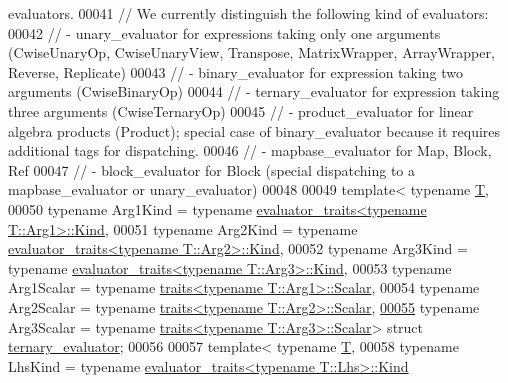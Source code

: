 \begin{DoxyCode}
{       evaluators.}
00041 \textcolor{comment}{// We currently distinguish the following kind of evaluators:}
00042 \textcolor{comment}{// - unary\_evaluator    for expressions taking only one arguments (CwiseUnaryOp, CwiseUnaryView, Transpose,
       MatrixWrapper, ArrayWrapper, Reverse, Replicate)}
00043 \textcolor{comment}{// - binary\_evaluator   for expression taking two arguments (CwiseBinaryOp)}
00044 \textcolor{comment}{// - ternary\_evaluator   for expression taking three arguments (CwiseTernaryOp)}
00045 \textcolor{comment}{// - product\_evaluator  for linear algebra products (Product); special case of binary\_evaluator because it
       requires additional tags for dispatching.}
00046 \textcolor{comment}{// - mapbase\_evaluator  for Map, Block, Ref}
00047 \textcolor{comment}{// - block\_evaluator    for Block (special dispatching to a mapbase\_evaluator or unary\_evaluator)}
00048 
00049 \textcolor{keyword}{template}< \textcolor{keyword}{typename} \hyperlink{group___sparse_core___module}{T},
00050           \textcolor{keyword}{typename} Arg1Kind   = \textcolor{keyword}{typename} 
      \hyperlink{struct_eigen_1_1internal_1_1_index_based}{evaluator\_traits<typename T::Arg1>::Kind},
00051           \textcolor{keyword}{typename} Arg2Kind   = \textcolor{keyword}{typename} 
      \hyperlink{struct_eigen_1_1internal_1_1_index_based}{evaluator\_traits<typename T::Arg2>::Kind},
00052           \textcolor{keyword}{typename} Arg3Kind   = \textcolor{keyword}{typename} 
      \hyperlink{struct_eigen_1_1internal_1_1_index_based}{evaluator\_traits<typename T::Arg3>::Kind},
00053           \textcolor{keyword}{typename} Arg1Scalar = \textcolor{keyword}{typename} \hyperlink{struct_eigen_1_1internal_1_1traits}{traits<typename T::Arg1>::Scalar},
00054           \textcolor{keyword}{typename} Arg2Scalar = \textcolor{keyword}{typename} \hyperlink{struct_eigen_1_1internal_1_1traits}{traits<typename T::Arg2>::Scalar},
\hyperlink{struct_eigen_1_1internal_1_1ternary__evaluator}{00055}           \textcolor{keyword}{typename} Arg3Scalar = \textcolor{keyword}{typename} \hyperlink{struct_eigen_1_1internal_1_1traits}{traits<typename T::Arg3>::Scalar}> \textcolor{keyword}{
      struct }\hyperlink{struct_eigen_1_1internal_1_1ternary__evaluator}{ternary\_evaluator};
00056 
00057 \textcolor{keyword}{template}< \textcolor{keyword}{typename} \hyperlink{group___sparse_core___module}{T},
00058           \textcolor{keyword}{typename} LhsKind   = \textcolor{keyword}{typename} \hyperlink{struct_eigen_1_1internal_1_1_index_based}{evaluator\_traits<typename T::Lhs>::Kind}

\end{DoxyCode}
